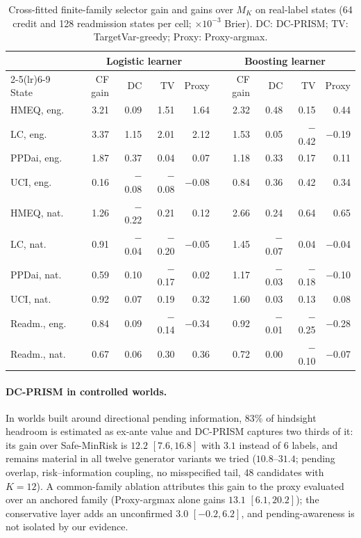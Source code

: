 \documentclass[runningheads]{llncs}
\begin{document}
\begin{table}[t]
\caption{Cross-fitted finite-family selector gain and gains over $M_K$ on real-label states (64 credit and 128 readmission states per cell; $\times10^{-3}$ Brier). DC: DC-PRISM; TV: TargetVar-greedy; Proxy: Proxy-argmax.}
\label{tab:who}
\centering\scriptsize
\setlength{\tabcolsep}{3pt}
\begin{tabular}{lrrrrrrrr}
\toprule
& \multicolumn{4}{c}{Logistic learner} & \multicolumn{4}{c}{Boosting learner} \\
\cmidrule(lr){2-5}\cmidrule(lr){6-9}
State & CF gain & DC & TV & Proxy & CF gain & DC & TV & Proxy \\
\midrule
HMEQ, eng. & 3.21 & 0.09 & 1.51 & 1.64 & 2.32 & 0.48 & 0.15 & 0.44 \\
LC, eng. & 3.37 & 1.15 & 2.01 & 2.12 & 1.53 & 0.05 & $-$0.42 & $-$0.19 \\
PPDai, eng. & 1.87 & 0.37 & 0.04 & 0.07 & 1.18 & 0.33 & 0.17 & 0.11 \\
UCI, eng. & 0.16 & $-$0.08 & $-$0.08 & $-$0.08 & 0.84 & 0.36 & 0.42 & 0.34 \\
HMEQ, nat. & 1.26 & $-$0.22 & 0.21 & 0.12 & 2.66 & 0.24 & 0.64 & 0.65 \\
LC, nat. & 0.91 & $-$0.04 & $-$0.20 & $-$0.05 & 1.45 & $-$0.07 & 0.04 & $-$0.04 \\
PPDai, nat. & 0.59 & 0.10 & $-$0.17 & 0.02 & 1.17 & $-$0.03 & $-$0.18 & $-$0.10 \\
UCI, nat. & 0.92 & 0.07 & 0.19 & 0.32 & 1.60 & 0.03 & 0.13 & 0.08 \\
Readm., eng. & 0.84 & 0.09 & $-$0.14 & $-$0.34 & 0.92 & $-$0.01 & $-$0.25 & $-$0.28 \\
Readm., nat. & 0.67 & 0.06 & 0.30 & 0.36 & 0.72 & 0.00 & $-$0.10 & $-$0.07 \\
\bottomrule
\end{tabular}
\end{table}

\paragraph{DC-PRISM in controlled worlds.} In worlds built around directional pending information, 83\% of hindsight headroom is estimated as ex-ante value and DC-PRISM captures two thirds of it: its gain over Safe-MinRisk is $12.2$ $[7.6,16.8]$ with $3.1$ instead of 6 labels, and remains material in all twelve generator variants we tried ($10.8$--$31.4$; pending overlap, risk--information coupling, no misspecified tail, 48 candidates with $K=12$). A common-family ablation attributes this gain to the proxy evaluated over an anchored family (Proxy-argmax alone gains $13.1$ $[6.1,20.2]$); the conservative layer adds an unconfirmed $3.0$ $[-0.2,6.2]$, and pending-awareness is not isolated by our evidence.
\end{document}
